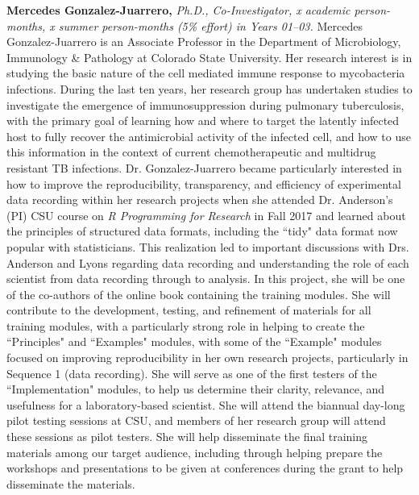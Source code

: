 \documentclass[pdftex,english,11pt,parskip=half]{scrartcl}
\begin{document}
\noindent \textbf{Mercedes Gonzalez-Juarrero,} \textit{Ph.D., Co-Investigator, x academic person-months, x summer person-months (5\% effort) in Years 01--03.} Mercedes Gonzalez-Juarrero is an Associate Professor in the Department of Microbiology, Immunology \& Pathology at Colorado State University. Her research interest is in studying the basic nature of the cell mediated immune response to mycobacteria infections. During the last ten years, her research group has undertaken studies to investigate the emergence of immunosuppression during pulmonary tuberculosis, with the primary goal of learning how and where to target the latently infected host to fully recover the antimicrobial activity of the infected cell, and how to use this information in the context of current chemotherapeutic and multidrug resistant TB infections. Dr. Gonzalez-Juarrero became particularly interested in how to improve the reproducibility, transparency, and efficiency of experimental data recording within her research projects when she attended Dr. Anderson's (PI) CSU course on \textit{R Programming for Research} in Fall 2017 and learned about the principles of structured data formats, including the ``tidy" data format now popular with statisticians. This realization led to important discussions with Drs. Anderson and Lyons regarding data recording and understanding the role of each scientist from data recording through to analysis. In this project, she will be one of the co-authors of the online book containing the training modules. She will contribute to the development, testing, and refinement of materials for all training modules, with a particularly strong role in helping to create the ``Principles" and ``Examples" modules, with some of the ``Example" modules focused on improving reproducibility in her own research projects, particularly in Sequence 1 (data recording). She will serve as one of the first testers of the ``Implementation" modules, to help us determine their clarity, relevance, and usefulness for a laboratory-based scientist. She will attend the biannual day-long pilot testing sessions at CSU, and members of her research group will attend these sessions as pilot testers. She will help disseminate the final training materials among our target audience, including through helping prepare the workshops and presentations to be given at conferences during the grant to help disseminate the materials.
\end{document}
